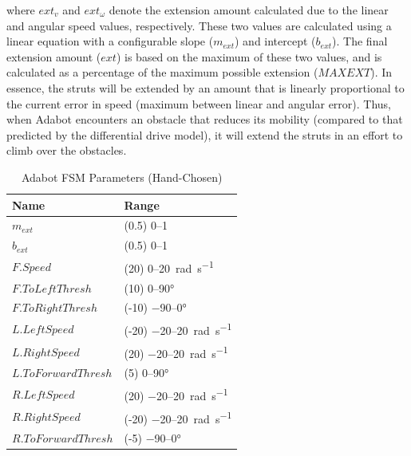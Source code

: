 \noindent
where $\mathit{ext}_v$ and $\mathit{ext}_\omega$ denote the extension amount calculated due to the linear and angular speed values, respectively. These two values are calculated using a linear equation with a configurable slope ($m_{\mathit{ext}}$) and intercept ($b_{\mathit{ext}}$).
%
The final extension amount ($\mathit{ext}$) is based on the maximum of these two values, and is calculated as a percentage of the maximum possible extension ($\mathit{MAXEXT}$).
%
In essence, the struts will be extended by an amount that is linearly proportional to the current error in speed (maximum between linear and angular error).
%
Thus, when Adabot encounters an obstacle that reduces its mobility  (compared to that predicted by the differential drive model), it will extend the struts in an effort to climb over the obstacles.


\begin{table}[thb]
    \centering
    \caption{Adabot FSM Parameters (Hand-Chosen)}
    \label{tbl:params-fsm}
    \begin{tabular}{@{}ll@{}}
        \toprule
        \textbf{Name} & \textbf{Range}\\
        \midrule
        $m_{\mathit{ext}}$ & (0.5) \numrange{0}{1}\\
        $b_{\mathit{ext}}$ & (0.5) \numrange{0}{1}\\
        $F.Speed$ & (20) \numrange{0}{20}~\si{\radian\per\second} \\
        $F.ToLeftThresh$ & (10) \numrange{0}{90}\si{\degree}\\
        $F.ToRightThresh$ & (-10) \numrange{-90}{0}\si{\degree}\\
        $L.LeftSpeed$ & (-20) \numrange{-20}{20}~\si{\radian\per\second} \\
        $L.RightSpeed$ & (20) \numrange{-20}{20}~\si{\radian\per\second} \\
        $L.ToForwardThresh$ & (5) \numrange{0}{90}\si{\degree}\\
        $R.LeftSpeed$ & (20) \numrange{-20}{20}~\si{\radian\per\second} \\
        $R.RightSpeed$ & (-20) \numrange{-20}{20}~\si{\radian\per\second} \\
        $R.ToForwardThresh$ & (-5) \numrange{-90}{0}\si{\degree}\\
        \bottomrule
    \end{tabular}
\end{table}


